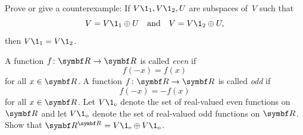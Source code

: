 \begin{exercises}
\exercise
Prove or give a counterexample: If $V\1_1, V\1_2, U$ are subspaces of~$V$ such that
\[
V = V\1_1 \oplus U \andd V = V\1_2 \oplus U,
\]
then $V\1_1 = V\1_2$.


\exercise
A function $f\colon \R{} \to \R{}$ is called \emph{even} if
\[
f(-x) = f(x)
\]
for all $x \in \R{}$. A function $f\colon \R{} \to \R{}$ is called \emph{odd} if
\[
f(-x) = -f(x)
\]
for all $x \in \R{}$. Let $V\1_\text{e}$ denote the set of real-valued even functions on $\R{}$ and let $V\1_\text{o}$ denote the set of real-valued odd functions on $\R{}$.
Show that $\R{\R{}} = V\1_\text{e} \oplus V\1_\text{o}$.


\end{exercises}

\CrCom

\endinput 

